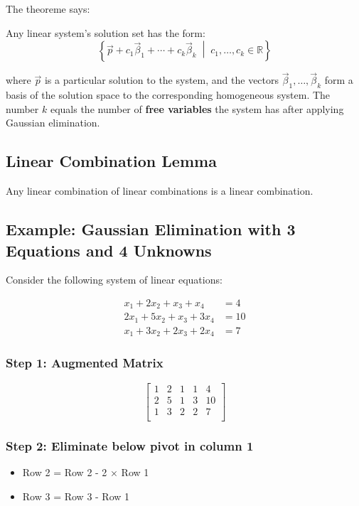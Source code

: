  The theoreme says:

Any linear system's solution set has the form:
\[
	\left\{ \vec{p} + c_1\vec{\beta}_1 + \cdots + c_k\vec{\beta}_k \;\middle|\; c_1, \ldots, c_k \in \mathbb{R} \right\}
\]

where \(\vec{p}\) is a particular solution to the system, and the vectors \(\vec{\beta}_1, \ldots, \vec{\beta}_k\) form a basis of the solution space to the corresponding homogeneous system. The number \(k\) equals the number of \textbf{free variables} the system has after applying Gaussian elimination.

\subsection{Linear Combination Lemma}
Any linear combination of linear combinations is a linear combination.

\subsection{Example: Gaussian Elimination with 3 Equations and 4 Unknowns}

Consider the following system of linear equations:

\begin{align*}
	x_1 + 2x_2 + x_3 + x_4   & = 4  \\
	2x_1 + 5x_2 + x_3 + 3x_4 & = 10 \\
	x_1 + 3x_2 + 2x_3 + 2x_4 & = 7
\end{align*}

\subsubsection*{Step 1: Augmented Matrix}

\[
	\begin{bmatrix}
		1 & 2 & 1 & 1 & 4  \\
		2 & 5 & 1 & 3 & 10 \\
		1 & 3 & 2 & 2 & 7  \\
	\end{bmatrix}
\]

\subsubsection*{Step 2: Eliminate below pivot in column 1}

\begin{itemize}[label=\(-\)]
	\item Row 2 = Row 2 - 2 × Row 1
	\item Row 3 = Row 3 - Row 1
\end{itemize}

